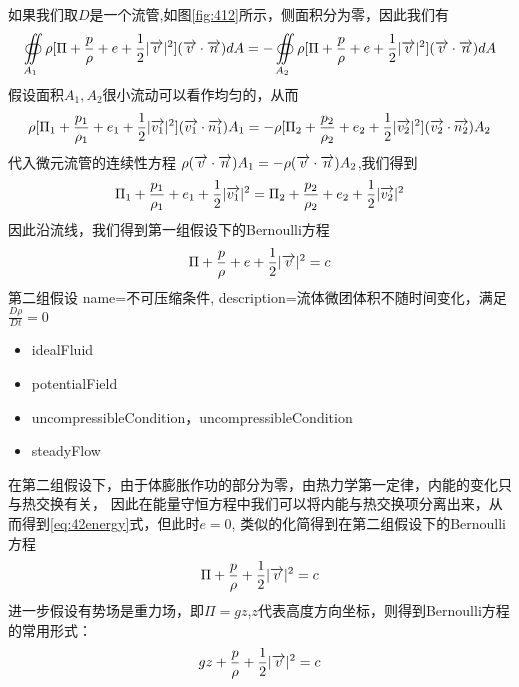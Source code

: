 如果我们取$D$是一个流管,如图\ref{fig:412}所示，侧面积分为零，因此我们有
\begin{equation}
\oiint\limits_{A_1} \rho[\Pi + \frac{p}{\rho} + e + \frac{1}{2} |\overrightarrow{v}|^2](\overrightarrow{v}\cdot \overrightarrow{n})dA=
-\oiint\limits_{A_2} \rho[\Pi + \frac{p}{\rho} + e + \frac{1}{2} |\overrightarrow{v}|^2](\overrightarrow{v}\cdot \overrightarrow{n})dA
\end{equation}
假设面积$A_1,A_2$很小流动可以看作均匀的，从而
\begin{equation}
\rho[\Pi_1 + \frac{p_1}{\rho_1} + e_1 + \frac{1}{2} |\overrightarrow{v_1}|^2](\overrightarrow{v_1}\cdot \overrightarrow{n_1})A_1=
-\rho[\Pi_2 + \frac{p_2}{\rho_2} + e_2 + \frac{1}{2} |\overrightarrow{v_2}|^2](\overrightarrow{v_2}\cdot \overrightarrow{n_2})A_2
\end{equation}
代入微元流管的连续性方程
$\rho(\overrightarrow{v}\cdot \overrightarrow{n})A_1=-\rho(\overrightarrow{v}\cdot \overrightarrow{n})A_2$,我们得到
\begin{equation}
\Pi_1 + \frac{p_1}{\rho_1} + e_1 + \frac{1}{2} |\overrightarrow{v_1}|^2 = \Pi_2 + \frac{p_2}{\rho_2} + e_2 + \frac{1}{2} |\overrightarrow{v_2}|^2
\end{equation}
因此沿流线，我们得到第一组假设下的Bernoulli方程
\begin{equation}
\Pi + \frac{p}{\rho} + e + \frac{1}{2} |\overrightarrow{v}|^2=c
\end{equation}
第二组假设
{
  name=不可压缩条件,
  description={流体微团体积不随时间变化，满足$\frac{D \rho}{D t}=0$}
}
\begin{itemize}
\item \gls{idealFluid}
\item \gls{potentialField}
\item \gls{uncompressibleCondition}，\glsdesc{uncompressibleCondition}
\item \gls{steadyFlow}
\end{itemize}
在第二组假设下，由于体膨胀作功的部分为零，由热力学第一定律，内能的变化只与热交换有关，
因此在能量守恒方程中我们可以将内能与热交换项分离出来，从而得到\eqref{eq:42energy}式，但此时$e=0$,
类似的化简得到在第二组假设下的Bernoulli方程
\begin{equation}
\Pi + \frac{p}{\rho} + \frac{1}{2} |\overrightarrow{v}|^2 = c
\end{equation}
进一步假设有势场是重力场，即$\Pi=gz$,$z$代表高度方向坐标，则得到Bernoulli方程的常用形式：
\begin{equation}
gz + \frac{p}{\rho} + \frac{1}{2} |\overrightarrow{v}|^2 = c
\end{equation}

\begin{equation}
\end{equation}
